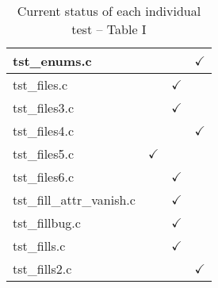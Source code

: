 \begin{table}[H]
\begin{tabular}{|l|c|c|c|}
tst\_enums.c            &               &               & $\checkmark$  \\ \hline
tst\_files.c            &               & $\checkmark$  &               \\ \hline
tst\_files3.c           &               & $\checkmark$  &               \\ \hline
tst\_files4.c           &               &               & $\checkmark$  \\ \hline
tst\_files5.c           & $\checkmark$  &               &               \\ \hline
tst\_files6.c           &               & $\checkmark$  &               \\ \hline
tst\_fill\_attr\_vanish.c   &           & $\checkmark$  &               \\ \hline
tst\_fillbug.c          &               & $\checkmark$  &               \\ \hline
tst\_fills.c            &               & $\checkmark$  &               \\ \hline
tst\_fills2.c           &               &               & $\checkmark$  \\ \hline
\hline
\end{tabular}
\caption{\label{tab:nc_test4_status_1} Current status of each individual test -- Table I}
\end{table}

